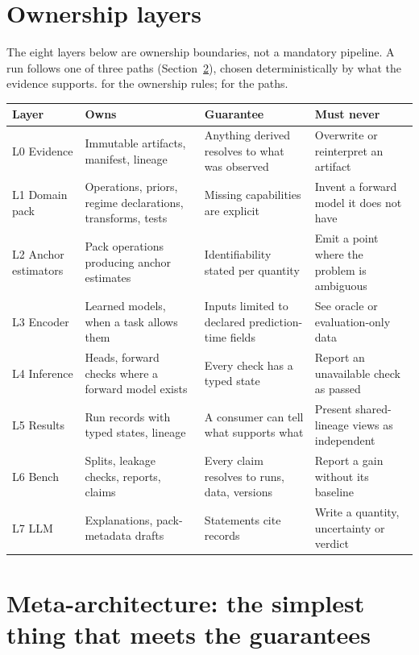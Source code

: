 \documentclass[11pt,a4paper]{article}
\begin{document}
\section{Ownership layers}

The eight layers below are ownership boundaries, not a mandatory pipeline. A run follows one of three paths (Section~\ref{sec:meta}), chosen deterministically by what the evidence supports. \tagG{} for the ownership rules; \tagP{} for the paths.

\begin{center}\small
\begin{tabular}{@{}p{2.2cm}p{3.4cm}p{4.6cm}p{4cm}@{}}
\toprule
Layer & Owns & Guarantee & Must never \\
\midrule
L0 Evidence & Immutable artifacts, manifest, lineage & Anything derived resolves to what was observed & Overwrite or reinterpret an artifact \\
L1 Domain pack & Operations, priors, regime declarations, transforms, tests & Missing capabilities are explicit & Invent a forward model it does not have \\
L2 Anchor estimators & Pack operations producing anchor estimates & Identifiability stated per quantity & Emit a point where the problem is ambiguous \\
L3 Encoder & Learned models, when a task allows them & Inputs limited to declared prediction-time fields & See oracle or evaluation-only data \\
L4 Inference & Heads, forward checks where a forward model exists & Every check has a typed state & Report an unavailable check as passed \\
L5 Results & Run records with typed states, lineage & A consumer can tell what supports what & Present shared-lineage views as independent \\
L6 Bench & Splits, leakage checks, reports, claims & Every claim resolves to runs, data, versions & Report a gain without its baseline \\
L7 LLM & Explanations, pack-metadata drafts & Statements cite records & Write a quantity, uncertainty or verdict \\
\bottomrule
\end{tabular}
\end{center}

\section{Meta-architecture: the simplest thing that meets the guarantees}
\label{sec:meta}
\end{document}
